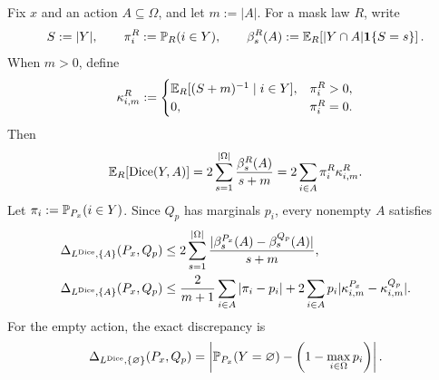 \begin{proposition}
\label{app:prop:dice-cardinality}
Fix $x$ and an action $A\subseteq\Omega$, and let $m:=|A|$. For a mask law
$R$, write
\begin{equation*}
  S:=|Y|,
  \qquad
  \pi_i^R:=\mathbb{P}_R(i\in Y),
  \qquad
  \beta_s^R(A)
  :=\mathbb{E}_R\!\left[
      |Y\cap A|\mathbf 1\{S=s\}\right].
\end{equation*}
When $m>0$, define
\begin{equation*}
  \kappa_{i,m}^R
  :=
  \begin{cases}
    \mathbb{E}_R[(S+m)^{-1}\mid i\in Y],&\pi_i^R>0,\\
    0,&\pi_i^R=0.
  \end{cases}
\end{equation*}
Then
\begin{equation}
  \mathbb{E}_R[\operatorname{Dice}(Y,A)]
  =
  2\sum_{s=1}^{|\Omega|}
      \frac{\beta_s^R(A)}{s+m}
  =
  2\sum_{i\in A}\pi_i^R\kappa_{i,m}^R.
  \label{app:eq:dice-cardinality}
\end{equation}
Let $\pi_i:=\mathbb{P}_{P_x}(i\in Y)$. Since $Q_p$ has marginals $p_i$, every
nonempty $A$ satisfies
\begin{align}
  \Delta_{L^{\operatorname{Dice}},\{A\}}(P_x,Q_p)
  &\leq
  2\sum_{s=1}^{|\Omega|}
    \frac{|\beta_s^{P_x}(A)-\beta_s^{Q_p}(A)|}{s+m},
  \label{app:eq:dice-overlap-cardinality-bound}\\
  \Delta_{L^{\operatorname{Dice}},\{A\}}(P_x,Q_p)
  &\leq
  \frac{2}{m+1}\sum_{i\in A}|\pi_i-p_i|
  +
  2\sum_{i\in A}p_i
    |\kappa_{i,m}^{P_x}-\kappa_{i,m}^{Q_p}|.
  \label{app:eq:dice-reciprocal-cardinality-bound}
\end{align}
For the empty action, the exact discrepancy is
\begin{equation}
  \Delta_{L^{\operatorname{Dice}},\{\varnothing\}}(P_x,Q_p)
  =
  \left|
    \mathbb{P}_{P_x}(Y=\varnothing)
    -
    \left(1-\max_{i\in\Omega}p_i\right)
  \right|.
  \label{app:eq:dice-empty-action}
\end{equation}
\end{proposition}

